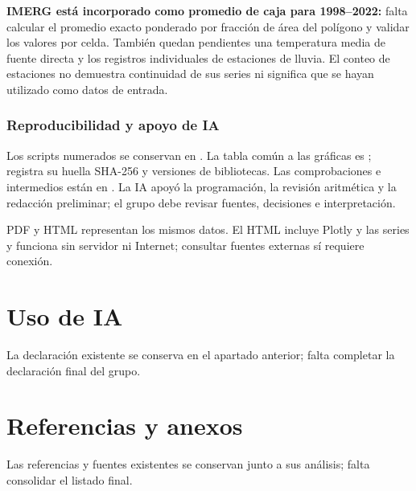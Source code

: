 \documentclass[10pt,a4paper]{article}
\begin{document}
\textbf{IMERG está incorporado como promedio de caja para 1998--2022:} falta
calcular el promedio exacto ponderado por fracción de área del polígono y validar
los valores por celda. También quedan pendientes una temperatura media de fuente
directa y los registros individuales de estaciones de lluvia. El conteo de estaciones
no demuestra continuidad de sus series ni significa que se hayan utilizado como datos de entrada.

\subsubsection*{Reproducibilidad y apoyo de IA}
Los scripts numerados se conservan en .
La tabla común a las gráficas es ;
 registra su huella SHA-256 y versiones de bibliotecas.
Las comprobaciones e intermedios están en .
La IA apoyó la programación, la revisión aritmética y la redacción preliminar;
el grupo debe revisar fuentes, decisiones e interpretación.

PDF y HTML representan los mismos datos. El HTML incluye Plotly y las series y
funciona sin servidor ni Internet; consultar fuentes externas sí requiere conexión.

\section*{Uso de IA}
La declaración existente se conserva en el apartado anterior; falta completar la declaración final del grupo.
\section*{Referencias y anexos}
Las referencias y fuentes existentes se conservan junto a sus análisis; falta consolidar el listado final.
\end{document}
